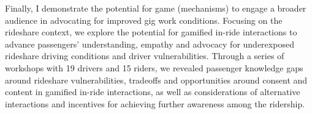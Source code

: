 Finally, I demonstrate the potential for game (mechanisms) to engage a broader audience in advocating for improved gig work conditions. Focusing on the rideshare context, we explore the potential for gamified in-ride interactions to advance passengers' understanding, empathy and advocacy for underexposed rideshare driving conditions and driver vulnerabilities.
Through a series of workshops with 19 drivers and 15 riders, we revealed passenger knowledge gaps around rideshare vulnerabilities, tradeoffs and opportunities around consent and content in gamified in-ride interactions, as well as considerations of alternative interactions and incentives for achieving further awareness among the ridership.

\vfill

\endgroup			

\vfill